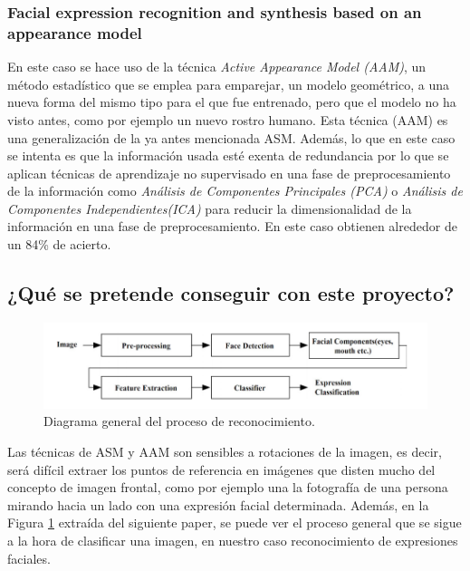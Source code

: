 \documentclass[a4paper,11pt]{book}
\begin{document}
\subsubsection{Facial expression recognition and synthesis based on an appearance model\cite{abboud_davoine_dang04}}
En este caso se hace uso de la técnica \textit{Active Appearance Model (AAM)}\cite{cootes_edwards_taylor98}, un método estadístico que se emplea para emparejar, un modelo geométrico, a una nueva forma del mismo tipo para el que fue entrenado, pero que el modelo no ha visto antes, como por ejemplo un nuevo rostro humano. Esta técnica (AAM)  es una generalización de la ya antes mencionada ASM\cite{cootes_taylor_cooper_graham94}.
Además, lo que en este caso se intenta es que la información usada esté exenta de redundancia por lo que se aplican técnicas de aprendizaje no supervisado en una fase de preprocesamiento de la información como \textit{Análisis de Componentes Principales (PCA)} o \textit{Análisis de Componentes Independientes(ICA)} para reducir la dimensionalidad de la información  en una fase de preprocesamiento. En este caso obtienen alrededor de un 84\% de acierto.

\subsection{¿Qué se pretende conseguir con este proyecto?}
\label{subsec:aspirations}
\begin{figure}[!]
	\centering
	\includegraphics[width=0.7\linewidth]{imagenes/feg_diagram}
	\caption[Diagrama FER]{Diagrama general del proceso de reconocimiento.}
	\label{fig:feg_diagram}
\end{figure}
Las técnicas de ASM\cite{cootes_taylor_cooper_graham94} y AAM\cite{cootes_edwards_taylor98} son sensibles a rotaciones de la imagen, es decir, será difícil extraer los puntos de referencia en imágenes que disten mucho del concepto de imagen frontal, como por ejemplo una la fotografía de una persona mirando hacia un lado con una expresión facial determinada. Además, en la Figura \ref{fig:feg_diagram} extraída del siguiente paper\cite{kumari_rajesh_pooja15}, se puede ver el proceso general que se sigue a la hora de clasificar una imagen, en nuestro caso reconocimiento de expresiones faciales.\\
\end{document}
